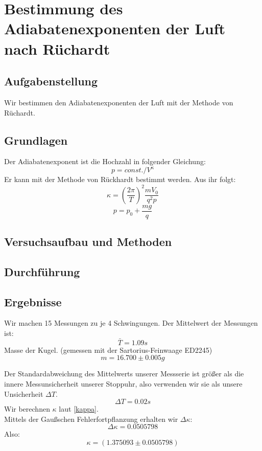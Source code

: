 \documentclass{article}
\begin{document}
\section{Bestimmung des Adiabatenexponenten der Luft nach Rüchardt}
\subsection{Aufgabenstellung}
Wir bestimmen den Adiabatenexponenten der Luft mit der Methode von Rüchardt.
\subsection{Grundlagen}
Der Adiabatenexponent ist die Hochzahl in folgender Gleichung:\\
$$p=const./V^{\kappa}$$
Er kann mit der Methode von Rückhardt bestimmt werden. Aus ihr folgt:
\begin{equation}
\label{kappa}
\kappa=(\frac{2\pi}{T})^2 \frac{mV_0}{q^2p}
\end{equation}
$$p=p_0+\frac{mg}{q}$$
\subsection{Versuchsaufbau und Methoden}
\subsection{Durchführung}
\subsection{Ergebnisse}
Wir machen 15 Messungen zu je 4 Schwingungen. Der Mittelwert der Messungen ist:\\
$$\bar{T}=1.09s$$
Masse der Kugel. (gemessen mit der Sartorius-Feinwaage ED2245)\\
$$m=16.700\pm0.005g$$

Der Standardabweichung des Mittelwerts unserer Messserie ist größer als die innere Messunsicherheit unserer Stoppuhr, also verwenden wir sie als unsere Unsicherheit $\Delta T$.
$$\Delta T=0.02s$$
Wir  berechnen $\kappa$ laut \ref{kappa}. \\
Mittels der Gaußschen Fehlerfortpflanzung erhalten wir $\Delta\kappa$:
$$\Delta\kappa=0.0505798$$
Also:
$$\boxed{\kappa=(1.375093 \pm 0.0505798)} $$
\end{document}
